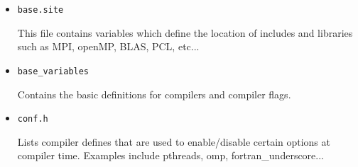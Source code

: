 \begin{itemize}

\item{{\tt base.site}}

This file contains variables which define the location of includes and
libraries such as MPI, openMP, BLAS, PCL, etc...

\item{{\tt base\_variables}}

Contains the basic definitions for compilers and compiler flags.

\item{{\tt conf.h}}

Lists compiler defines that are used to enable/disable certain options at
compiler time.  Examples include pthreads, omp, fortran\_underscore...

\end{itemize}





